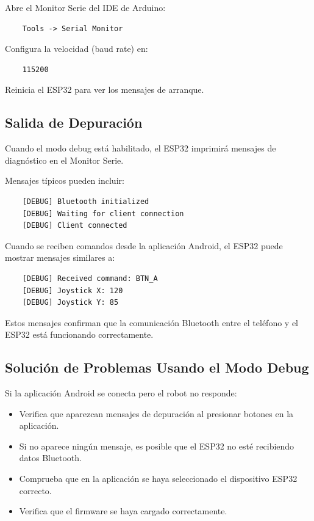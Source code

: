Abre el Monitor Serie del IDE de Arduino:

\begin{verbatim}
    Tools -> Serial Monitor
\end{verbatim}

Configura la velocidad (baud rate) en:

\begin{verbatim}
    115200
\end{verbatim}

Reinicia el ESP32 para ver los mensajes de arranque.

\subsection{Salida de Depuración}

Cuando el modo debug está habilitado, el ESP32 imprimirá mensajes de diagnóstico en el Monitor Serie.

Mensajes típicos pueden incluir:

\begin{verbatim}
    [DEBUG] Bluetooth initialized
    [DEBUG] Waiting for client connection
    [DEBUG] Client connected
\end{verbatim}

Cuando se reciben comandos desde la aplicación Android, el ESP32 puede mostrar mensajes similares a:

\begin{verbatim}
    [DEBUG] Received command: BTN_A
    [DEBUG] Joystick X: 120
    [DEBUG] Joystick Y: 85
\end{verbatim}

Estos mensajes confirman que la comunicación Bluetooth entre el teléfono y el ESP32 está funcionando correctamente.

\subsection{Solución de Problemas Usando el Modo Debug}

Si la aplicación Android se conecta pero el robot no responde:

\begin{itemize}
    \item Verifica que aparezcan mensajes de depuración al presionar botones en la aplicación.
    \item Si no aparece ningún mensaje, es posible que el ESP32 no esté recibiendo datos Bluetooth.
    \item Comprueba que en la aplicación se haya seleccionado el dispositivo ESP32 correcto.
    \item Verifica que el firmware se haya cargado correctamente.
\end{itemize}

